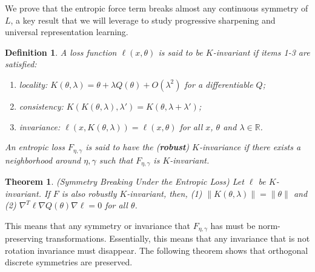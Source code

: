 \documentclass{article}
\theoremstyle{plain}
\newtheorem{theorem}{Theorem}
\newtheorem{definition}{Definition}
\begin{document}
We prove that the entropic force term breaks almost any continuous symmetry of $L$, a key result that we will leverage to study progressive sharpening and universal representation learning.
\begin{definition}
    A loss function $\ell(x, \theta)$ is said to be $K$-invariant if items 1-3 are satisfied:
     \begin{enumerate}[noitemsep,topsep=0pt, parsep=0pt,partopsep=0pt]
         \item locality: $K(\theta, \lambda ) = \theta + \lambda Q(\theta) + O(\lambda^2)$ for a differentiable $Q$;
         \item consistency: $K(K(\theta,\lambda), \lambda')= K(\theta, \lambda +\lambda')$;
         \item invariance: $\ell(x, K(\theta,\lambda)) = \ell(x, \theta)$ for all $x$, $\theta$ and $\lambda \in \mathbb{R}$.
         
     \end{enumerate}
     An entropic loss $F_{\eta,\gamma}$ is said to have the (\textbf{robust}) $K$-invariance if there exists a neighborhood around $\eta,\gamma$ such that $F_{\eta,\gamma}$ is $K$-invariant. 
\end{definition}


\begin{theorem}\label{theo: symmetry breaking} (Symmetry Breaking Under the Entropic Loss)
Let $\ell$ be $K$-invariant. If $F$ is also robustly $K$-invariant, then, (1) $\|K(\theta, \lambda)\| =\|\theta\|$ and (2) $\nabla^T\ell \nabla Q(\theta) \nabla \ell = 0$ for all $\theta$. %
\end{theorem}

This means that any symmetry or invariance that $F_{\eta,\gamma}$ has must be norm-preserving transformations. Essentially, this means that any invariance that is not rotation invariance must disappear. 
The following theorem shows that orthogonal discrete symmetries are preserved.
\end{document}
